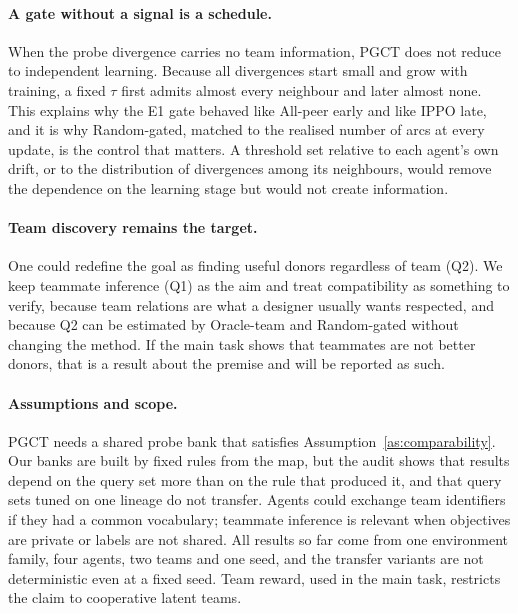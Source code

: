 \documentclass{article}
\theoremstyle{remark}
\newcommand{\ours}{PGCT}
\begin{document}
\paragraph{A gate without a signal is a schedule.} When the probe divergence carries no team information, \ours{} does not
reduce to independent learning. Because all divergences start small and grow with training, a fixed $\tau$ first admits almost
every neighbour and later almost none. This explains why the E1 gate behaved like All-peer early and like IPPO late, and it is
why Random-gated, matched to the realised number of arcs at every update, is the control that matters. A threshold set relative
to each agent's own drift, or to the distribution of divergences among its neighbours, would remove the dependence on the
learning stage but would not create information.

\paragraph{Team discovery remains the target.} One could redefine the goal as finding useful donors regardless of team (Q2).
We keep teammate inference (Q1) as the aim and treat compatibility as something to verify, because team relations are what a
designer usually wants respected, and because Q2 can be estimated by Oracle-team and Random-gated without changing the method.
If the main task shows that teammates are not better donors, that is a result about the premise and will be reported as such.

\paragraph{Assumptions and scope.} \ours{} needs a shared probe bank that satisfies Assumption~\ref{as:comparability}. Our banks
are built by fixed rules from the map, but the audit shows that results depend on the query set more than on the rule that
produced it, and that query sets tuned on one lineage do not transfer. Agents could exchange team identifiers if they had a
common vocabulary; teammate inference is relevant when objectives are private or labels are not shared. All results so far come
from one environment family, four agents, two teams and one seed, and the transfer variants are not deterministic even at a
fixed seed. Team reward, used in the main task, restricts the claim to cooperative latent teams.
\end{document}
